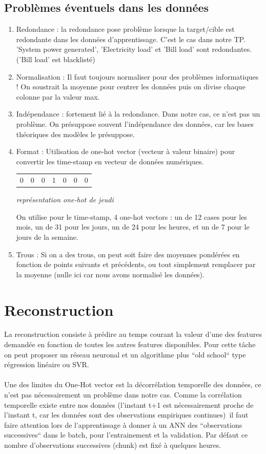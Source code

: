 \documentclass{article}
\begin{document}
\subsection{Problèmes éventuels dans les données}
\begin{enumerate}
    \item Redondance : la redondance pose problème lorsque la target/cible est redondante dans les données d'apprentissage. C'est le cas dans notre TP. 'System power generated', 'Electricity load' et 'Bill load' sont redondantes. ('Bill load' est blacklisté)
    \item Normalisation : Il faut toujours normaliser pour des problèmes informatiques ! On soustrait la moyenne pour centrer les données puis on divise chaque colonne par la valeur max.
    \item Indépendance : fortement lié à la redondance. Dans notre cas, ce n'est pas un problème. On présuppose souvent l'indépendance des données, car les bases théoriques des modèles le présuppose.
    \item Format : Utilisation de one-hot vector (vecteur à valeur binaire) pour convertir les time-stamp en vecteur de données numériques. 
    
     \begin{center}
    \begin{tabular}{c|c|c|c|c|c|c}
        0 & 0 & 0 & 1 & 0 & 0 & 0 
    \end{tabular} 
    \textit{représentation one-hot de jeudi}
    \end{center}
    On utilise pour le time-stamp, 4 one-hot vectors : un de 12 cases pour les mois, un de 31 pour les jours, un de 24 pour les heures, et un de 7 pour le jours de la semaine.
    \item Trous : Si on a des trous, on peut soit faire des moyennes pondérées en fonction de points suivants et précédents, ou tout simplement remplacer par la moyenne (nulle ici car nous avons normalisé les données).
    \end{enumerate}

\section{Reconstruction}
   La reconstruction consiste à prédire au temps courant la valeur d’une des features demandée en fonction de toutes les autres features disponibles. Pour cette tâche on peut proposer un réseau neuronal et un algorithme plus ``old school`` type régression linéaire ou SVR.\\\\Une des limites du One-Hot vector est la décorrélation temporelle des données, ce n’est pas nécessairement un problème dans notre cas. Comme la corrélation temporelle existe entre nos données (l’instant t+1 est nécessairement proche de l’instant t, car les données sont des observations empiriques continues)\, il faut faire attention lors de l’apprentissage à donner à un ANN des ``observations successives`` dans le batch, pour l’entrainement et la validation. Par défaut ce nombre d’observations successives (chunk) est fixé à quelques heures.
   
\end{document}
